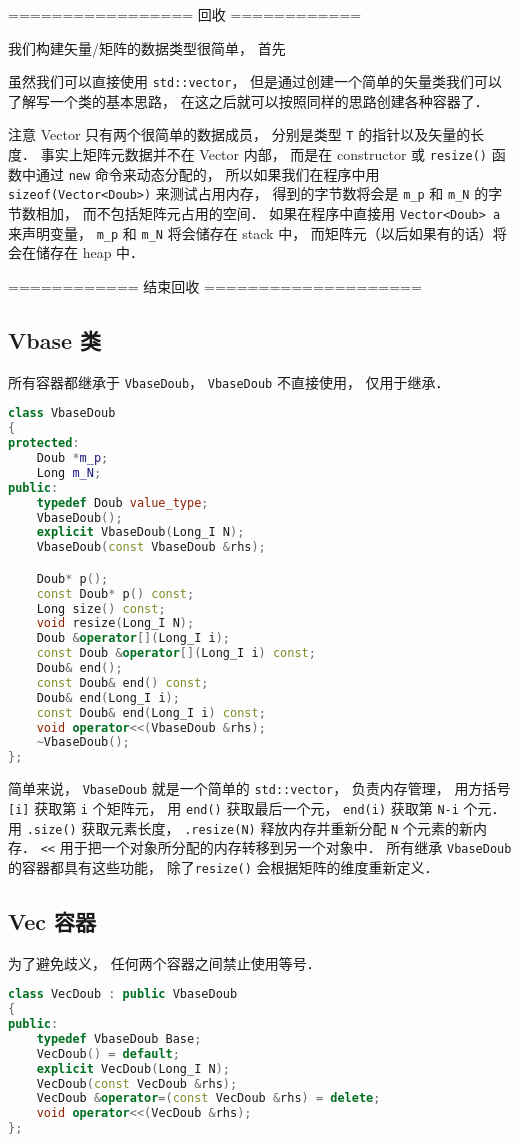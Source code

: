 ================= 回收 ============

我们构建矢量/矩阵的数据类型很简单， 首先

虽然我们可以直接使用 \verb|std::vector|， 但是通过创建一个简单的矢量类我们可以了解写一个类的基本思路， 在这之后就可以按照同样的思路创建各种容器了．

注意 Vector 只有两个很简单的数据成员， 分别是类型 \verb|T| 的指针以及矢量的长度． 事实上矩阵元数据并不在 Vector 内部， 而是在 constructor 或 \verb|resize()| 函数中通过 \verb|new| 命令来动态分配的， 所以如果我们在程序中用 \verb|sizeof(Vector<Doub>)| 来测试占用内存， 得到的字节数将会是 \verb|m_p| 和 \verb|m_N| 的字节数相加， 而不包括矩阵元占用的空间． 如果在程序中直接用 \verb|Vector<Doub> a| 来声明变量， \verb|m_p| 和 \verb|m_N| 将会储存在 stack 中， 而矩阵元（以后如果有的话）将会在储存在 heap 中．

============ 结束回收 ====================

\subsection{Vbase 类}
所有容器都继承于 \verb|VbaseDoub|， \verb|VbaseDoub| 不直接使用， 仅用于继承．
\begin{lstlisting}[language=cpp]
class VbaseDoub
{
protected:
    Doub *m_p;
    Long m_N;
public:
    typedef Doub value_type;
    VbaseDoub();
    explicit VbaseDoub(Long_I N);
    VbaseDoub(const VbaseDoub &rhs);

    Doub* p();
    const Doub* p() const;
    Long size() const;
    void resize(Long_I N);
    Doub &operator[](Long_I i);
    const Doub &operator[](Long_I i) const;
    Doub& end();
    const Doub& end() const;
    Doub& end(Long_I i);
    const Doub& end(Long_I i) const;
    void operator<<(VbaseDoub &rhs);
    ~VbaseDoub();
};
\end{lstlisting}

简单来说， \verb|VbaseDoub| 就是一个简单的 \verb|std::vector|， 负责内存管理， 用方括号 \verb|[i]| 获取第 \verb|i| 个矩阵元， 用 \verb|end()| 获取最后一个元， \verb|end(i)| 获取第 \verb|N-i| 个元． 用 \verb|.size()| 获取元素长度， \verb|.resize(N)| 释放内存并重新分配 \verb|N| 个元素的新内存． \verb|<<| 用于把一个对象所分配的内存转移到另一个对象中． 所有继承 \verb|VbaseDoub| 的容器都具有这些功能， 除了\verb|resize()| 会根据矩阵的维度重新定义．

\subsection{Vec 容器}
为了避免歧义， 任何两个容器之间禁止使用等号．
\begin{lstlisting}[language=cpp]
class VecDoub : public VbaseDoub
{
public:
    typedef VbaseDoub Base;
    VecDoub() = default;
    explicit VecDoub(Long_I N);
    VecDoub(const VecDoub &rhs);
    VecDoub &operator=(const VecDoub &rhs) = delete;
    void operator<<(VecDoub &rhs);
};
\end{lstlisting}

